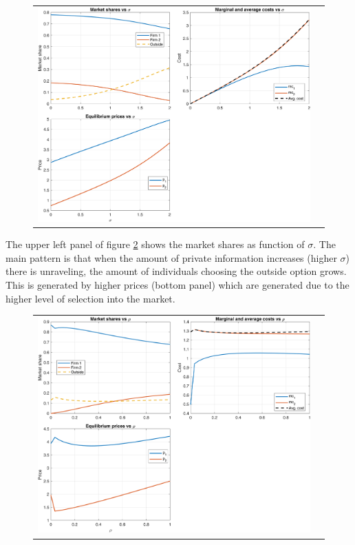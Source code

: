 \documentclass[12pt]{article}
\theoremstyle{plain}
\theoremstyle{plain}
\begin{document}
\begin{figure}[H]
\caption{}
 \label{fig:sigma}
\centering{}%
\begin{tabular}{cc}
\includegraphics[scale=.7]{figures/simulations/sigma_panels_2firms.png} 
\end{tabular}
\end{figure}


The upper left panel of figure \ref{fig:sigma} shows the market shares as function of $\sigma$. The main pattern is that when the amount of private information increases (higher $\sigma$) there is unraveling, the amount of individuals choosing the outside option grows. This is generated by higher prices (bottom panel) which are generated due to the higher level of selection into the market. 


 \begin{figure}[H]
\caption{}
 \label{fig:sigma}
\centering{}%
\begin{tabular}{cc}
\includegraphics[scale=.7]{figures/simulations/rho_panels_2firms.png} 
\end{tabular}
\end{figure}
\end{document}
